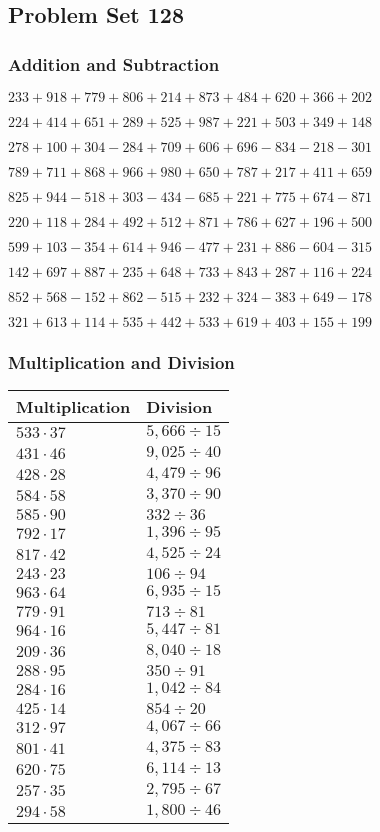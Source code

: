 \hypertarget{problem-set-128}{%
\subsection{Problem Set 128}\label{problem-set-128}}

\hypertarget{addition-and-subtraction}{%
\subsubsection{Addition and
Subtraction}\label{addition-and-subtraction}}

\(233 +918 +779 +806 +214 +873 +484 +620 +366 +202\)

\(224 +414 +651 +289 +525 +987 +221 +503 +349 +148\)

\(278 +100 +304 - 284 +709 +606 +696 - 834 - 218 - 301\)

\(789 +711 +868 +966 +980 +650 +787 +217 +411 +659\)

\(825 +944 - 518 +303 - 434 - 685 +221 +775 +674 - 871\)

\(220 +118 +284 +492 +512 +871 +786 +627 +196 +500\)

\(599 +103 - 354 +614 +946 - 477 +231 +886 - 604 - 315\)

\(142 +697 +887 +235 +648 +733 +843 +287 +116 +224\)

\(852 +568 - 152 +862 - 515 +232 +324 - 383 +649 - 178\)

\(321 +613 +114 +535 +442 +533 +619 +403 +155 +199\)

\hypertarget{multiplication-and-division}{%
\subsubsection{Multiplication and
Division}\label{multiplication-and-division}}

\begin{longtable}[]{@{}ll@{}}
\toprule
Multiplication & Division\tabularnewline
\midrule
\endhead
\(533 \cdot 37\) & \(5,666÷15\)\tabularnewline
\(431 \cdot 46\) & \(9,025÷40\)\tabularnewline
\(428 \cdot 28\) & \(4,479÷96\)\tabularnewline
\(584 \cdot 58\) & \(3,370÷90\)\tabularnewline
\(585 \cdot 90\) & \(332÷36\)\tabularnewline
\(792 \cdot 17\) & \(1,396÷95\)\tabularnewline
\(817 \cdot 42\) & \(4,525÷24\)\tabularnewline
\(243 \cdot 23\) & \(106÷94\)\tabularnewline
\(963 \cdot 64\) & \(6,935÷15\)\tabularnewline
\(779 \cdot 91\) & \(713÷81\)\tabularnewline
\(964 \cdot 16\) & \(5,447÷81\)\tabularnewline
\(209 \cdot 36\) & \(8,040÷18\)\tabularnewline
\(288 \cdot 95\) & \(350÷91\)\tabularnewline
\(284 \cdot 16\) & \(1,042÷84\)\tabularnewline
\(425 \cdot 14\) & \(854÷20\)\tabularnewline
\(312 \cdot 97\) & \(4,067÷66\)\tabularnewline
\(801 \cdot 41\) & \(4,375÷83\)\tabularnewline
\(620 \cdot 75\) & \(6,114÷13\)\tabularnewline
\(257 \cdot 35\) & \(2,795÷67\)\tabularnewline
\(294 \cdot 58\) & \(1,800÷46\)\tabularnewline
\bottomrule
\end{longtable}
